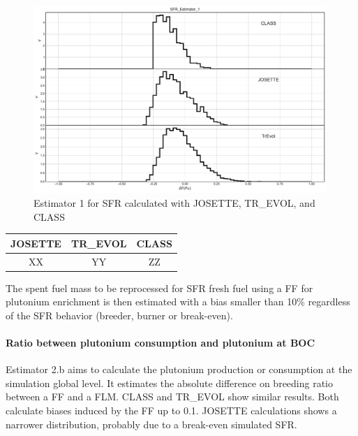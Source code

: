 \begin{figure}[h]
	\begin{center}
		\includegraphics[width = 0.99\textwidth]{../../Feature_1/RAW_DATA/FIG/SFR_Estimator_1.pdf}
		\caption{Estimator 1 for \gls{SFR} calculated with JOSETTE, TR\_EVOL, and CLASS}
		\label{fig:Est1_SFR}
	\end{center}
\end{figure}

\begin{table}[h]
	\begin{center}
		\begin{tabular}{|c||c||c|}
			\hline 
				JOSETTE & TR\_EVOL & CLASS \\
			\hline
				XX & YY & ZZ \\
		\end{tabular}
	\end{center}
	\label{table:Est1Dev_SFR}
\end{table}

The spent fuel mass to be reprocessed for \gls{SFR} fresh fuel using a \gls{FF}
for plutonium enrichment is then estimated with a bias smaller than 10\%
regardless of the \gls{SFR} behavior (breeder, burner or break-even).  

\paragraph{Ratio between plutonium consumption and plutonium at \gls{BOC}}

Estimator 2.b aims to calculate the plutonium production or consumption at the
simulation global level. It estimates the absolute difference on breeding
ratio between a \gls{FF} and a \gls{FLM}. CLASS and TR\_EVOL show similar
results. Both calculate biases induced by the \gls{FF} up to 0.1. JOSETTE
calculations shows a narrower distribution, probably due to a
break-even simulated \gls{SFR}.   


